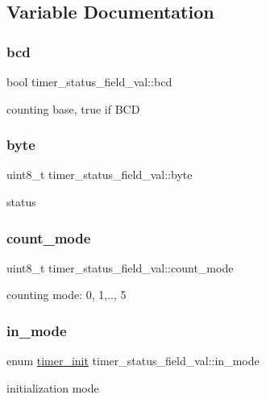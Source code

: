 \subsection{Variable Documentation}
\mbox{\label{group__timer_gad1c0daae1fe44fc16a05f435123a99f2}} 
\subsubsection{\texorpdfstring{bcd}{bcd}}
{\footnotesize\ttfamily bool timer\+\_\+status\+\_\+field\+\_\+val\+::bcd}

counting base, true if B\+CD \mbox{\label{group__timer_ga37d15361e9d111d7f18f943d85964f51}} 
\subsubsection{\texorpdfstring{byte}{byte}}
{\footnotesize\ttfamily uint8\+\_\+t timer\+\_\+status\+\_\+field\+\_\+val\+::byte}

status \mbox{\label{group__timer_ga069cd58184fd977a3345d560f159037a}} 
\subsubsection{\texorpdfstring{count\+\_\+mode}{count\_mode}}
{\footnotesize\ttfamily uint8\+\_\+t timer\+\_\+status\+\_\+field\+\_\+val\+::count\+\_\+mode}

counting mode\+: 0, 1,.., 5 \mbox{\label{group__timer_ga16c0028c537ce578196381bdc0cd97fd}} 
\subsubsection{\texorpdfstring{in\+\_\+mode}{in\_mode}}
{\footnotesize\ttfamily enum \hyperlink{group__timer_ga5cc20f14fd50625eea9b20f58fbe2a55}{timer\+\_\+init} timer\+\_\+status\+\_\+field\+\_\+val\+::in\+\_\+mode}

initialization mode 